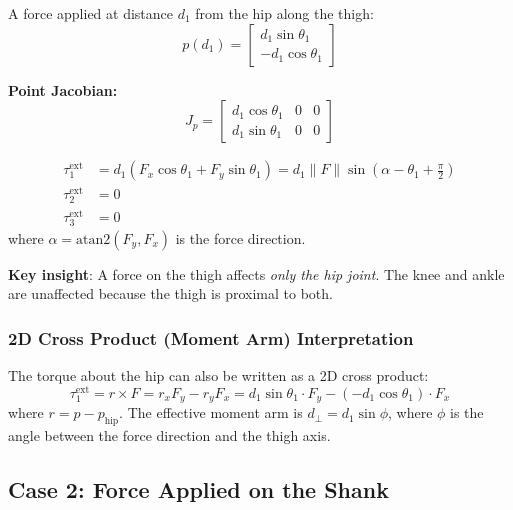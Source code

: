 \documentclass[11pt,a4paper]{article}
\newcommand{\vc}[1]{\bm{#1}}
\def\vc#1{#1}%
\def\bm#1{#1}%
\begin{document}
A force applied at distance $d_1$ from the hip along the thigh:
\begin{equation}
    \vc{p}(d_1) = \begin{bmatrix} d_1 \sin\theta_1 \\ -d_1 \cos\theta_1 \end{bmatrix}
\end{equation}

\textbf{Point Jacobian:}
\begin{equation}
    \vc{J}_{p} = \begin{bmatrix}
        d_1 \cos\theta_1 & 0 & 0 \\
        d_1 \sin\theta_1 & 0 & 0
    \end{bmatrix}
    \label{eq:J_thigh}
\end{equation}

\begin{resultbox}
\begin{align}
    \tau_1^{\text{ext}} &= d_1 (F_x \cos\theta_1 + F_y \sin\theta_1)
                        = d_1 \|\vc{F}\| \sin(\alpha - \theta_1 + \tfrac{\pi}{2}) \label{eq:tau1_thigh} \\
    \tau_2^{\text{ext}} &= 0 \label{eq:tau2_thigh} \\
    \tau_3^{\text{ext}} &= 0 \label{eq:tau3_thigh}
\end{align}
where $\alpha = \text{atan2}(F_y, F_x)$ is the force direction.

\textbf{Key insight}: A force on the thigh affects \textit{only the hip joint}.
The knee and ankle are unaffected because the thigh is proximal to both.
\end{resultbox}

\subsubsection*{2D Cross Product (Moment Arm) Interpretation}

The torque about the hip can also be written as a 2D cross product:
\begin{equation}
    \tau_1^{\text{ext}} = \vc{r} \times \vc{F} = r_x F_y - r_y F_x
    = d_1 \sin\theta_1 \cdot F_y - (-d_1 \cos\theta_1) \cdot F_x
\end{equation}
where $\vc{r} = \vc{p} - \vc{p}_{\text{hip}}$. The effective moment arm is
$d_{\perp} = d_1 \sin\phi$, where $\phi$ is the angle between the force
direction and the thigh axis.

\subsection{Case 2: Force Applied on the Shank}
\end{document}

